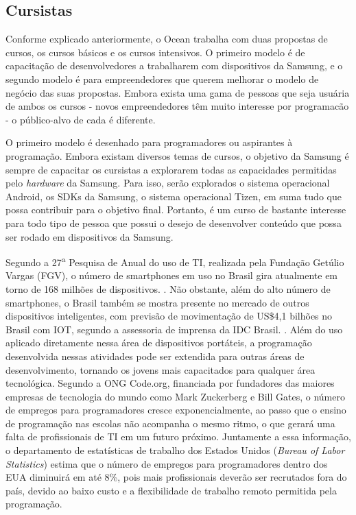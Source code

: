 \subsection{Cursistas}
\label{sec:con_cursistas}

Conforme explicado anteriormente, o Ocean trabalha com duas propostas de cursos, os cursos básicos e os cursos intensivos. O primeiro modelo é de capacitação de desenvolvedores a trabalharem com dispositivos da Samsung, e o segundo modelo é para empreendedores que querem melhorar o modelo de negócio das suas propostas. Embora exista uma gama de pessoas que seja usuária de ambos os cursos - novos empreendedores têm muito interesse por programacão - o público-alvo de cada é diferente.

O primeiro modelo é desenhado para programadores ou aspirantes à programação. Embora existam diversos temas de cursos, o objetivo da Samsung é sempre de capacitar os cursistas a explorarem todas as capacidades permitidas pelo \textit{hardware} da Samsung. Para isso, serão explorados o sistema operacional Android, os SDKs da Samsung, o sistema operacional Tizen, em suma tudo que possa contribuir para o objetivo final. Portanto, é um curso de bastante interesse para todo tipo de pessoa que possui o desejo de desenvolver conteúdo que possa ser rodado em dispositivos da Samsung.

Segundo a 27\textsuperscript{a} Pesquisa de Anual do uso de TI, realizada pela Fundação Getúlio Vargas (FGV), o número de smartphones em uso no Brasil gira atualmente em torno de 168 milhões de dispositivos. \cite{tifgv}. Não obstante, além do alto número de smartphones, o Brasil também se mostra presente no mercado de outros dispositivos inteligentes, com previsão de movimentação de US\$4,1 bilhões no Brasil com IOT, segundo a assessoria de imprensa da IDC Brasil. \cite{idc}. Além do uso aplicado diretamente nessa área de dispositivos portáteis, a programação desenvolvida nessas atividades pode ser extendida para outras áreas de desenvolvimento, tornando os jovens mais capacitados para qualquer área tecnológica. Segundo a ONG Code.org, financiada por fundadores das maiores empresas de tecnologia do mundo como Mark Zuckerberg e Bill Gates, o número de empregos para programadores cresce exponencialmente, ao passo que o ensino de programação nas escolas não acompanha o mesmo ritmo, o que gerará uma falta de profissionais de TI em um futuro próximo. Juntamente a essa informação, o departamento de estatísticas de trabalho dos Estados Unidos (\textit{Bureau of Labor Statistics}) estima que o número de empregos para programadores dentro dos EUA diminuirá em até 8\%, pois mais profissionais deverão ser recrutados fora do país, devido ao baixo custo e a flexibilidade de trabalho remoto permitida pela programação. \cite{bls}

